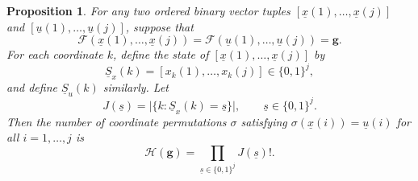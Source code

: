 \documentclass[letterpaper,draftclsnofoot,onecolumn]{IEEEtran}
\newtheorem{proposition}{Proposition}
\begin{document}
\begin{proposition}\label{prop:rearrange_number}
For any two ordered binary vector tuples 
$[\underline{x}(1),\ldots,\underline{x}(j)]$ and 
$[\underline{u}(1),\ldots,\underline{u}(j)]$, suppose that
\begin{equation}
\mathcal{F}(\underline{x}(1),\ldots,\underline{x}(j))
=
\mathcal{F}(\underline{u}(1),\ldots,\underline{u}(j))
=
\mathbf{g}.
\end{equation}
For each coordinate $k$, define the state of $[\underline{x}(1),\ldots,\underline{x}(j)]$ by
\begin{equation}
\underline{S}_x(k)=[x_k(1),\ldots,x_k(j)]\in\{0,1\}^j,
\end{equation}
and define $\underline{S}_u(k)$ similarly. Let
\begin{equation}
J(\underline{s})=\bigl|\{k:\underline{S}_x(k)=\underline{s}\}\bigr|,
\qquad \underline{s}\in\{0,1\}^j.
\end{equation}
Then the number of coordinate permutations $\sigma$ satisfying
$\sigma(\underline{x}(i))=\underline{u}(i)$ for all $i=1,\ldots,j$ is
\begin{equation}\label{eq:H_by_J}
\mathcal{H}(\mathbf{g})
=
\prod_{\underline{s}\in\{0,1\}^j} J(\underline{s})!.
\end{equation}
\end{proposition}
\end{document}
